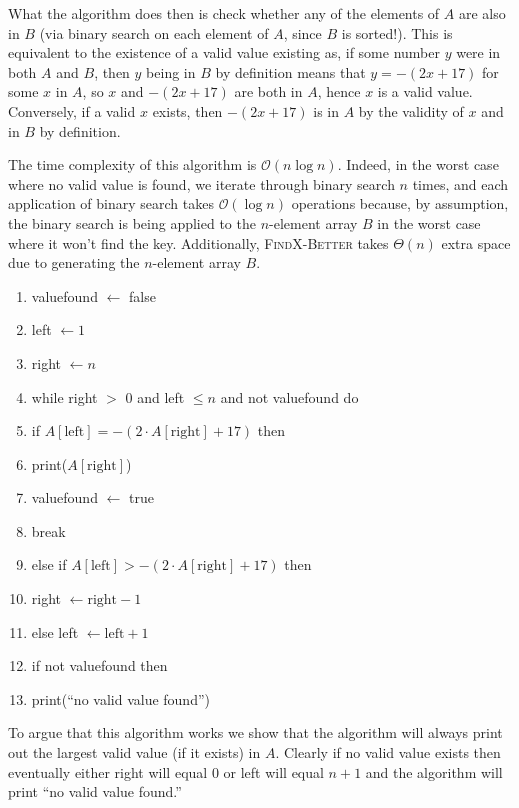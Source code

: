 \documentclass[10pt]{scrartcl}
\newenvironment{alg}[1]{\begin{algo}[#1]
		\setlist{nolistsep}
		\begin{enumerate}[\footnotesize{\arabic*.}\enspace, noitemsep]}{\end{enumerate}\end{algo}}
\providecommand{\ii}{\item}
\begin{document}
What the algorithm does then is check whether any of the elements of $A$
are also in $B$ (via binary search on each element of $A$,
since $B$ is sorted!).
This is equivalent to the existence of a valid value existing as,
if some number $y$ were in both $A$ and $B$,
then $y$ being in $B$ by definition means that $y = -(2x + 17)$
for some $x$ in $A$, so $x$ and $-(2x + 17)$ are both in $A$,
hence $x$ is a valid value. Conversely, if a valid $x$ exists,
then $-(2x + 17)$ is in $A$ by the validity of $x$ and in $B$ by definition.

The time complexity of this algorithm is $\mathcal O(n\log n)$.
Indeed, in the worst case where no valid value is found,
we iterate through binary search $n$ times, and each application
of binary search takes $\mathcal O(\log n)$ operations
because, by assumption, the binary search is being applied
to the $n$-element array $B$ in the worst case where it won't find the key.
Additionally, \textsc{FindX-Better} takes $\Theta(n)$ extra space
due to generating the $n$-element array $B$.

\begin{alg}{\textsc{FindX-Best($A[1\dots n]$)}}
	\ii valuefound $\gets$ false
	\ii left $\gets 1$
	\ii right $\gets n$
	\ii while right $>$ 0 and left $\le n$ and not valuefound do
	\ii \qquad if $A[\text{left}] = -(2\cdot A[\text{right}] + 17)$ then
	\ii \qquad \qquad print($A[\text{right}]$)
	\ii \qquad \qquad valuefound $\gets$ true
	\ii \qquad \qquad break
	\ii \qquad else if $A[\text{left}] > -(2\cdot A[\text{right}] + 17)$ then
	\ii \qquad \qquad right $\gets \text{right} - 1$
	\ii \qquad else left $\gets \text{left} + 1$
	\ii if not valuefound then
	\ii \qquad print(``no valid value found'')
\end{alg}

To argue that this algorithm works we show that
the algorithm will always print out the largest
valid value (if it exists) in $A$.
Clearly if no valid value exists
then eventually either right will equal $0$ or left will equal $n+1$
and the algorithm will print ``no valid value found.''
\end{document}

